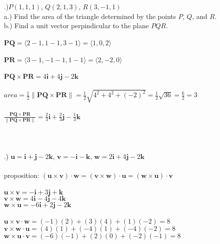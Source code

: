 \documentclass[12pt]{article}
\begin{document}
.)$P(1, 1, 1)$, \hspace{10pt} $Q(2, 1,3)$, \hspace{10pt} $R(3, -1, 1)$\\
\noindent a.) Find the area of the triangle determined by the points $P$, $Q$, and $R$. \\
\noindent b.) Find a unit vector perpindicular to the plane $PQR$.\\\\
\noindent $\mathbf{PQ} = \langle 2-1, 1-1, 3-1\rangle = \langle 1, 0, 2\rangle$\\\\
\noindent $\mathbf{PR} = \langle 3-1, -1-1, 1-1\rangle = \langle 2, -2, 0\rangle$\\\\
$\mathbf{PQ \times PR} = 4\mathbf{i} + 4\mathbf{j} - 2\mathbf{k}$\\\\
$area =\frac{1}{2} \| \mathbf{PQ \times PR} \| = \frac{1}{2}\sqrt{4^{2} + 4^{2} + (-2)^{2}} = \frac{1}{2}\sqrt{36} = \frac{6}{2} = 3$\\\\
$\frac{\mathbf{PQ \times PR}}{\| \mathbf{PQ \times PR} \|} = \frac{2}{3}\mathbf{i} + \frac{2}{3}\mathbf{j} - \frac{1}{3}\mathbf{k}$\\\\\\\\
.) $\mathbf{u} = \mathbf{i} + \mathbf{j} - 2\mathbf{k}$, \hspace{10pt} $\mathbf{v} =-\mathbf{i} - \mathbf{k} $, \hspace{10pt} $\mathbf{w} = 2\mathbf{i} +4\mathbf{j} - 2\mathbf{k}$\\\\
proposition: $(\mathbf{u \times v})\cdot \mathbf{w} = (\mathbf{v \times w})\cdot \mathbf{u} = (\mathbf{w \times u})\cdot \mathbf{v}$\\\\


\noindent $\mathbf{u \times v} =-\mathbf{i} + 3\mathbf{j} + \mathbf{k}$\\
\noindent $\mathbf{v \times w} = 4\mathbf{i} -4\mathbf{j} -4\mathbf{k} $\\
\noindent $\mathbf{w \times u} = -6\mathbf{i} + 2\mathbf{j} -2\mathbf{k}$\\\\
\noindent $\mathbf{u\times v}\cdot \mathbf{w} = (-1)(2)+ (3)(4) + (1)(-2) = 8$\\
\noindent $\mathbf{v\times w}\cdot \mathbf{u} = (4)(1)+ (-4)(1) + (-4)(-2) = 8$\\
\noindent $\mathbf{w\times u}\cdot \mathbf{v} = (-6)(-1)+ (2)(0) + (-2)(-1) = 8$\\\\
\end{document}
